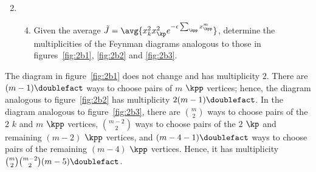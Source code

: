 \begin{enumerate}[leftmargin=0cm]
  \setcounter{enumi}{1}
  \item
        \begin{enumerate}
          \setcounter{enumii}{3}
          \item \label{2d}
                Given the average $\tilde{J} = \avg{x_k^2 x_\kp^2 e^{- \epsilon \sum_\kpp
                        x_\kpp^m }}$, determine the multiplicities of the Feynman diagrams analogous to
                those in figures~\ref{fig:2b1}, \ref{fig:2b2} and \ref{fig:2b3}.
        \end{enumerate}
\end{enumerate}

The diagram in figure~\ref{fig:2b1} does not change and has multiplicity $2$.
There are $(m - 1)\doublefact$ ways to choose pairs of $m$ $\kpp$ vertices;
hence, the diagram analogous to figure~\ref{fig:2b2} has multiplicity $2 (m -
  1)\doublefact$.
In the diagram analogous to figure~\ref{fig:2b3}, there are $\binom{m}{2}$ ways
to choose pairs of the $2$ $k$ and $m$ $\kpp$ vertices, $\binom{m - 2}{2}$ ways
to choose pairs of the $2$ $\kp$ and remaining $(m - 2)$ $\kpp$ vertices, and
$(m - 4 - 1)\doublefact$ ways to choose pairs of the remaining $(m - 4)$ $\kpp$
vertices.
Hence, it has multiplicity $\binom{m}{2} \binom{m - 2}{2} (m - 5)\doublefact$.
